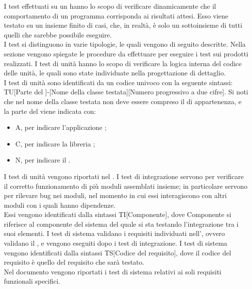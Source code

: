 		I test effettuati su un   hanno lo scopo di verificare dinamicamente che il comportamento di un programma corrisponda ai risultati attesi. Esso viene testato su un insieme finito di casi, che, in realtà, è solo un sottoinsieme di tutti quelli che sarebbe possibile eseguire.\\
		I test si distinguono in varie tipologie, le quali vengono di seguito descritte. Nella sezione  vengono spiegate le procedure da effettuare per eseguire i test sui prodotti realizzati.
				I test di unità hanno lo scopo di verificare la logica interna del codice delle unità, le quali sono state individuate nella progettazione di dettaglio. \\
				I test di unità sono identificati da un codice univoco con la seguente sintassi: TU[Parte del ]-[Nome della classe testata][Numero progressivo a due cifre]. Si noti che nel nome della classe testata non deve essere compreso il  di appartenenza, e la parte del  viene indicata con:
				\begin{itemize}
					\item A, per indicare l'applicazione ;
					\item C, per indicare la libreria ;
					\item N, per indicare il  .
				\end{itemize}
				I test di unità vengono riportati nel .
				I test di integrazione servono per verificare il corretto funzionamento di più moduli assemblati insieme; in particolare servono per rilevare bug nei moduli, nel momento in cui essi interagiscono con altri moduli con i quali hanno dipendenze.\\
				Essi vengono identificati dalla sintassi TI[Componente], dove Componente si riferisce al componente del sistema del quale si sta testando l'integrazione tra i suoi elementi.
				I test di sistema validano i requisiti individuati nell', ovvero validano il  , e vengono eseguiti dopo i test di integrazione.
				I test di sistema vengono identificati dalla sintassi TS[Codice del requisito], dove il codice del requisito è quello del requisito che sarà testato.\\
				Nel documento  vengono riportati i test di sistema relativi ai soli requisiti funzionali specifici.
